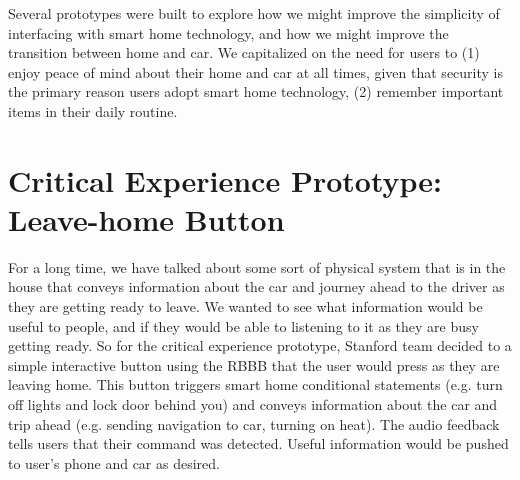 %
%
%
\vspace{1em}

Several prototypes were built to explore how we might improve the simplicity of interfacing with smart home technology, and how we might improve the transition between home and car. We capitalized on the need for users to (1) enjoy peace of mind about their home and car at all times, given that security is the primary reason users adopt smart home technology, (2) remember important items in their daily routine.
\section{Critical Experience Prototype: Leave-home Button}

For a long time, we have talked about some sort of physical system that is in the house that conveys information about the car and journey ahead to the driver as they are getting ready to leave. We wanted to see what information would be useful to people, and if they would be able to listening to it as they are busy getting ready. So for the critical experience prototype, Stanford team decided to a simple interactive button using the RBBB that the user would press as they are leaving home. This button triggers smart home conditional statements (e.g. turn off lights and lock door behind you) and conveys information about the car and trip ahead (e.g. sending navigation to car, turning on heat). The audio feedback tells users that their command was detected. Useful information would be pushed to user’s phone and car as desired.

